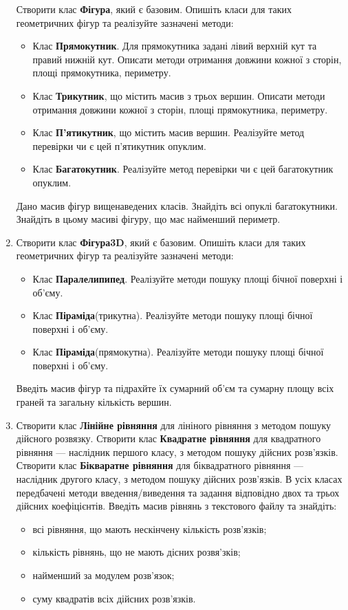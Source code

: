 \documentclass[a5paper,titlepage,openany,twoside,draft]{book_unv}%
\begin{document}
\begin{enumerate}
Створити клас \textbf{Фігура}, який є базовим.  Опишіть класи для 
таких геометричних фігур та реалізуйте зазначені методи:
\begin{itemize}
\item
Клас \textbf{Прямокутник}. 
Для прямокутника задані лівий верхній кут та правий нижній кут.
Описати методи отримання довжини кожної з сторін, площі прямокутника,
периметру. 
\item
Клас \textbf{ Трикутник}, що містить масив з трьох вершин. 
Описати методи отримання довжини кожної з сторін, площі прямокутника,
периметру. 
\item
Клас \textbf{ П'ятикутник}, що містить масив вершин. 
Реалізуйте метод перевірки чи є цей п'ятикутник опуклим.
\item
Клас \textbf{ Багатокутник}. 
Реалізуйте метод перевірки чи є цей багатокутник опуклим.
\end{itemize}
Дано масив фігур вищенаведених класів. Знайдіть всі опуклі багатокутники.
Знайдіть в цьому масиві фігуру, що має найменший периметр.

\item

Створити клас \textbf{Фігура3D}, який є базовим.  Опишіть класи для 
таких геометричних фігур та реалізуйте зазначені методи:
\begin{itemize}
\item
  Клас \textbf{Паралелипипед}. Реалізуйте методи пошуку площі бічної поверхні і
  об'єму.
\item
  Клас \textbf{Піраміда}(трикутна). Реалізуйте методи пошуку площі бічної поверхні і
  об'єму.
\item
  Клас \textbf{Піраміда}(прямокутна). Реалізуйте методи пошуку площі бічної поверхні і
  об'єму.
\end{itemize}
Введіть масив фігур та підрахйте їх сумарний об'єм та сумарну площу всіх граней 
та загальну кількість вершин.

\item
Створити клас \textbf{Лінійне рівняння} для лініного рівняння з методом пошуку дійсного розвязку.
Створити клас \textbf{Квадратне рівняння} для квадратного рівняння --- наслідник першого класу,
з методом пошуку дійсних розв'язків.
Створити клас \textbf{Бікваратне рівняння} для біквадратного рівняння --- наслідник другого класу,
з методом пошуку дійсних розв'язків. В усіх класах передбачені методи введення/виведення та задання 
відповідно двох та трьох дійсних коефіцієнтів.
Введіть масив рівнянь з текстового файлу та знайдіть:
\begin{itemize}
\item
всі рівняння, що мають нескінчену кількість розв'язків;
\item
кількість рівнянь, що не мають дісних розвя'зків;
\item
найменший за модулем розв'язок;
\item
суму квадратів всіх дійсних розв'язків.
\end{itemize}


\end{enumerate}
\end{document}
